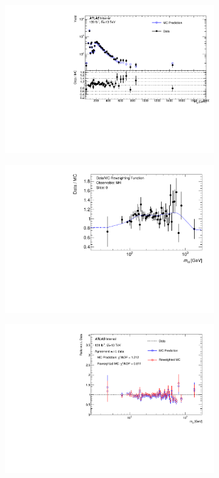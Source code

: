\begin{figure}[htb!]
    \begin{subfigure}{.49\textwidth}\centering
      \includegraphics[width=.99\linewidth]{Figures/m4l/DataDriven/RatioM4l.pdf}\caption{}
    \end{subfigure}
    \begin{subfigure}{.49\textwidth}\centering
      \includegraphics[width=.99\linewidth]{Figures/m4l/DataDriven/FitM4l-Slice0.pdf}
    \end{subfigure}
    \begin{subfigure}{.49\textwidth}\centering
      \includegraphics[width=.99\linewidth]{Figures/m4l/DataDriven/ReweightedM4l.pdf} 

\end{subfigure}
\end{figure}
